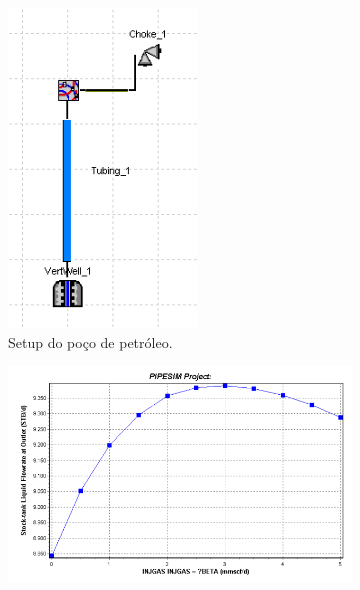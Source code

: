 \begin{figure}[H]
\centering
\begin{subfigure}{.25\textwidth}
  \centering
  \includegraphics[width=1\linewidth]{figs/setup1.png}
  \caption{Setup do poço de petróleo.}
  \label{fig:setup1_dia}
\end{subfigure}%
\begin{subfigure}{.75\textwidth}
  \centering
  \includegraphics[width=1\linewidth]{figs/truth1.png}

\end{subfigure}
\end{figure}
